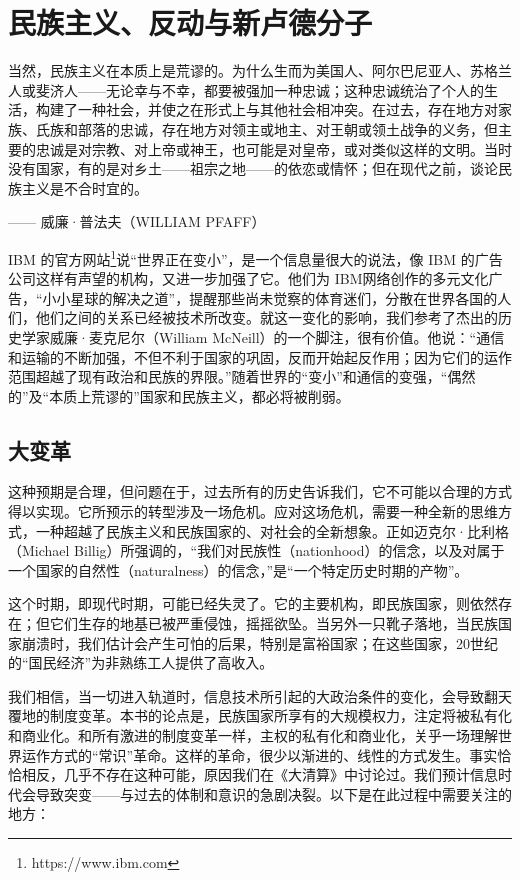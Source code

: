 \chapter{民族主义、反动与新卢德分子}

\begin{tcolorbox}
\kaishu 当然，民族主义在本质上是荒谬的。为什么生而为美国人、阿尔巴尼亚人、苏格兰人或斐济人——无论幸与不幸，都要被强加一种忠诚；这种忠诚统治了个人的生活，构建了一种社会，并使之在形式上与其他社会相冲突。在过去，存在地方对家族、氏族和部落的忠诚，存在地方对领主或地主、对王朝或领土战争的义务，但主要的忠诚是对宗教、对上帝或神王，也可能是对皇帝，或对类似这样的文明。当时没有国家，有的是对乡土——祖宗之地——的依恋或情怀；但在现代之前，谈论民族主义是不合时宜的。
\begin{flushright}
—— 威廉·普法夫（WILLIAM PFAFF）
\end{flushright}
\end{tcolorbox}

IBM 的官方网站\footnote{https://www.ibm.com}说“世界正在变小”，是一个信息量很大的说法，像 IBM 的广告公司这样有声望的机构，又进一步加强了它。他们为 IBM网络创作的多元文化广告，“小小星球的解决之道”，提醒那些尚未觉察的体育迷们，分散在世界各国的人们，他们之间的关系已经被技术所改变。就这一变化的影响，我们参考了杰出的历史学家威廉·麦克尼尔（William McNeill）的一个脚注，很有价值。他说：“通信和运输的不断加强，不但不利于国家的巩固，反而开始起反作用；因为它们的运作范围超越了现有政治和民族的界限。”随着世界的“变小”和通信的变强，“偶然的”及“本质上荒谬的”国家和民族主义，都必将被削弱。

\section{大变革}
这种预期是合理，但问题在于，过去所有的历史告诉我们，它不可能以合理的方式得以实现。它所预示的转型涉及一场危机。应对这场危机，需要一种全新的思维方式，一种超越了民族主义和民族国家的、对社会的全新想象。正如迈克尔·比利格（Michael Billig）所强调的，“我们对民族性（nationhood）的信念，以及对属于一个国家的自然性（naturalness）的信念，”是“一个特定历史时期的产物”。

这个时期，即现代时期，可能已经失灵了。它的主要机构，即民族国家，则依然存在；但它们生存的地基已被严重侵蚀，摇摇欲坠。当另外一只靴子落地，当民族国家崩溃时，我们估计会产生可怕的后果，特别是富裕国家；在这些国家，20世纪的“国民经济”为非熟练工人提供了高收入。

我们相信，当一切进入轨道时，信息技术所引起的大政治条件的变化，会导致翻天覆地的制度变革。本书的论点是，民族国家所享有的大规模权力，注定将被私有化和商业化。和所有激进的制度变革一样，主权的私有化和商业化，关乎一场理解世界运作方式的“常识”革命。这样的革命，很少以渐进的、线性的方式发生。事实恰恰相反，几乎不存在这种可能，原因我们在《大清算》中讨论过。我们预计信息时代会导致突变——与过去的体制和意识的急剧决裂。以下是在此过程中需要关注的地方：

